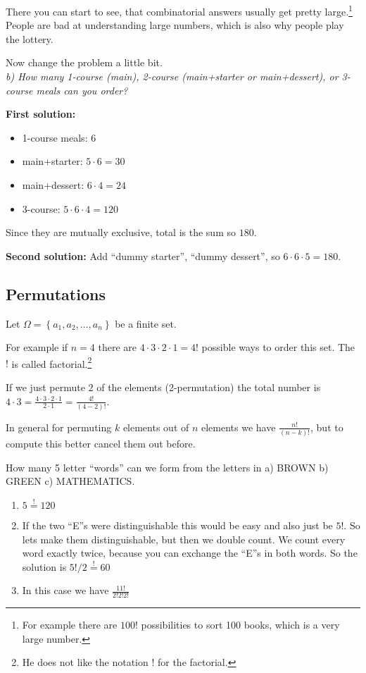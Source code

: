 \documentclass[english]{lbscript}
\begin{document}
There you can start to see, that combinatorial answers usually get pretty large.\footnote{For example there are \(100!\) possibilities to sort 100 books, which is a very large number.} People are bad at understanding large numbers, which is also why people play the lottery.

Now change the problem a little bit. \\
\emph{b) How many 1-course (main), 2-course (main+starter or main+dessert), or 3-course meals can you order?}

\textbf{First solution:}
\begin{itemize}
\item 1-course meals: \(6\)
\item main+starter: \(5⋅6=30\)
\item main+dessert: \(6⋅4=24\)
\item 3-course: \(5⋅6⋅4=120\)
\end{itemize}
Since they are mutually exclusive, total is the sum so \(180\).

\textbf{Second solution:}
Add ``dummy starter'', ``dummy dessert'', so \(6⋅6⋅5=180\).


\subsection{Permutations}
\label{sec:permutations}

Let \(𝛺=\left\{ a_1,a_2,\dots, a_n \right\} \) be a finite set.

For example if \(n=4\) there are \(4⋅3⋅2⋅1=4!\) possible ways to order this set. The \(!\) is called factorial.\footnote{He does not like the notation ! for the factorial.}

If we just permute \(2\) of the elements (2-permutation) the total number is \(4⋅3= \frac{4⋅3⋅2⋅1}{2⋅1}= \frac{4!}{(4-2)!}\).

In general for permuting \(k\) elements out of \(n\) elements we have \(\frac{n!}{(n-k)!}\), but to compute this better cancel them out before.

\begin{example}{How many 5 letter ``words'' can we form from the letters in a) BROWN b) GREEN c) MATHEMATICS.}{}
\begin{enumerate}[label=\alph{*})]
\item\label{item:1} \(5\overset{!}{=}120\)
\item\label{item:2} If the two ``E''s were distinguishable this would be easy and also just be \(5!\). So lets make them distinguishable, but then we double count. We count every word exactly twice, because you can exchange the ``E''s in both words. So the solution is \(5!/2\overset{!}{=}60\)
\item\label{item:3} In this case we have \(\frac{11!}{2!2!2!}\)
\end{enumerate}
\end{example}
\end{document}
